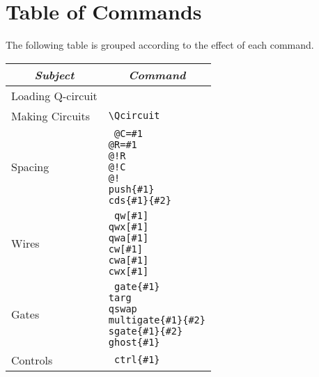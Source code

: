 \documentclass[twocolumn,nofootinbib]{revtex4}
\begin{document}
\pagebreak

\section{Table of Commands}

The following table is grouped according to the effect of each command.\\

{\small \begin{center}
    \begin{tabular}{l | l } 
        \multicolumn{1}{c}{\itshape Subject} & \multicolumn{1}{c}{\itshape Command }\\ \hline 
        Loading Q-circuit \hspace{.5em} & \verb== \\
        Making Circuits & \verb=\Qcircuit= \\
        Spacing & \parbox[t]{6cm}{\tt
                    @C=\#1 \\
                    @R=\#1 \\
                    @!R \\
                    @!C \\
                    @! \\
                     push\{\#1\} \\
                     cds\{\#1\}\{\#2\}}\\
        Wires & \parbox[t]{6cm}{\tt
                     qw[\#1] \\
                     qwx[\#1] \\
                     qwa[\#1] \\
                     cw[\#1] \\
                     cwa[\#1] \\
                     cwx[\#1] }\\
        Gates & \parbox[t]{6cm}{\tt
                     gate\{\#1\} \\
                     targ \\
                     qswap \\
                     multigate\{\#1\}\{\#2\} \\
                     sgate\{\#1\}\{\#2\}\\
                     ghost\{\#1\} }\\
        Controls & \parbox[t]{6cm}{\tt
                     ctrl\{\#1\} \\
}
\end{tabular}
\end{center}}
\end{document}
